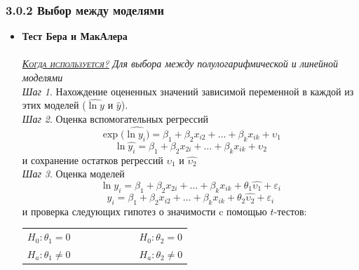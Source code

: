 \documentclass[a0,final]{a0poster}
\begin{document}
\begin{multicols}{4}
\subsubsection*{3.0.2 Выбор между моделями}
\begin{itemize}
\item \textbf{Тест Бера и МакАлера}\\
\\
\underline{\textsc{\textit{Когда используется?}}} \textit{Для выбора между полулогарифмической и линейной моделями}\\
\textit{Шаг 1}. Нахождение оцененных значений зависимой переменной в каждой из этих моделей ($\hat{\ln{y}}$ и $\hat{y}$).\\
\textit{Шаг 2}. Оценка вспомогательных регрессий
\[\exp{(\hat{\ln{y_i})}=\beta_1 + \beta_2x_{i2}+ \ldots +\beta_kx_{ik}+\upsilon_{1}}\]
\[\ln{\hat{y_i}}=\beta_1 + \beta_2x_{2i}+ \ldots +\beta_kx_{ik}+\upsilon_{2}\]
и сохранение остатков регрессий $\hat{\upsilon_1}$ и $\hat{\upsilon_2}$\\
\textit{Шаг 3}. Оценка моделей
\[\ln{y_i} = {\beta}_1 + \beta_2x_{2i}+ \ldots +\beta_kx_{ik} + {\theta}_1\hat{\upsilon_1} + \varepsilon_{i}\]
\[y_i ={\beta}_1 + \beta_2x_{i2}+ \ldots +\beta_kx_{ik} + {\theta}_2\hat{\upsilon_2} + \varepsilon_{i}\] и проверка следующих гипотез о значимости c помощью $t$-тестов:
\begin{center}
\begin{tabular}{r  l}
$H_0: \theta_1 = 0 \qquad \qquad \qquad$ &$H_0: \theta_2 = 0$ \\
$H_a: \theta_1 \ne 0 \qquad \qquad \qquad$&$H_a: \theta_2 \ne 0$
\end{tabular}
\end{center}


\end{itemize}
\end{multicols}
\end{document}
